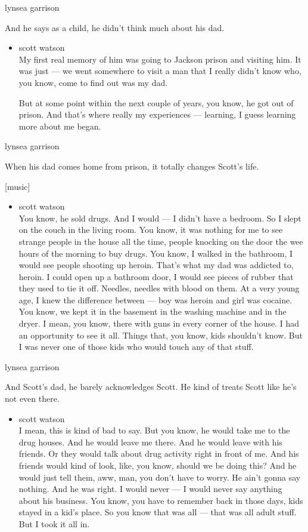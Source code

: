 lynsea garrison

And he says as a child, he didn't think much about his dad.

\begin{itemize}
\item
  scott watson\\
  My first real memory of him was going to Jackson prison and visiting
  him. It was just --- we went somewhere to visit a man that I really
  didn't know who, you know, come to find out was my dad.

  But at some point within the next couple of years, you know, he got
  out of prison. And that's where really my experiences --- learning, I
  guess learning more about me began.
\end{itemize}

lynsea garrison

When his dad comes home from prison, it totally changes Scott's life.

{[}music{]}

\begin{itemize}
\tightlist
\item
  scott watson\\
  You know, he sold drugs. And I would --- I didn't have a bedroom. So I
  slept on the couch in the living room. You know, it was nothing for me
  to see strange people in the house all the time, people knocking on
  the door the wee hours of the morning to buy drugs. You know, I walked
  in the bathroom, I would see people shooting up heroin. That's what my
  dad was addicted to, heroin. I could open up a bathroom door, I would
  see pieces of rubber that they used to tie it off. Needles, needles
  with blood on them. At a very young age, I knew the difference between
  --- boy was heroin and girl was cocaine. You know, we kept it in the
  basement in the washing machine and in the dryer. I mean, you know,
  there with guns in every corner of the house. I had an opportunity to
  see it all. Things that, you know, kids shouldn't know. But I was
  never one of those kids who would touch any of that stuff.
\end{itemize}

lynsea garrison

And Scott's dad, he barely acknowledges Scott. He kind of treats Scott
like he's not even there.

\begin{itemize}
\tightlist
\item
  scott watson\\
  I mean, this is kind of bad to say. But you know, he would take me to
  the drug houses. And he would leave me there. And he would leave with
  his friends. Or they would talk about drug activity right in front of
  me. And his friends would kind of look, like, you know, should we be
  doing this? And he would just tell them, aww, man, you don't have to
  worry. He ain't gonna say nothing. And he was right. I would never ---
  I would never say anything about his business. You know, you have to
  remember back in those days, kids stayed in a kid's place. So you know
  that was all --- that was all adult stuff. But I took it all in.
\end{itemize}

